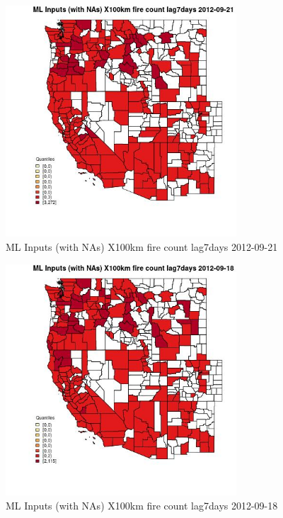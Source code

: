 \begin{figure} 
\centering  
\includegraphics[width=0.77\textwidth]{Code_Outputs/Report_ML_input_PM25_Step4_part_e_de_duplicated_aves_compiled_2019-05-14wNAs_CountyX100km_fire_count_lag7daysMean2012-09-21_2012-09-21.jpg} 
\caption{\label{fig:Report_ML_input_PM25_Step4_part_e_de_duplicated_aves_compiled_2019-05-14wNAsCountyX100km_fire_count_lag7daysMean2012-09-21_2012-09-21}ML Inputs (with NAs) X100km fire count lag7days 2012-09-21} 
\end{figure} 
 

\begin{figure} 
\centering  
\includegraphics[width=0.77\textwidth]{Code_Outputs/Report_ML_input_PM25_Step4_part_e_de_duplicated_aves_compiled_2019-05-14wNAs_CountyX100km_fire_count_lag7daysMean2012-09-18_2012-09-18.jpg} 
\caption{\label{fig:Report_ML_input_PM25_Step4_part_e_de_duplicated_aves_compiled_2019-05-14wNAsCountyX100km_fire_count_lag7daysMean2012-09-18_2012-09-18}ML Inputs (with NAs) X100km fire count lag7days 2012-09-18} 
\end{figure} 
 


